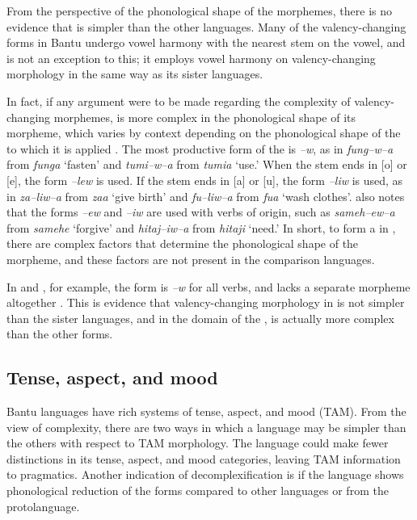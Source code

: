 \documentclass[output=paper,
modfonts
]{langscibook}
\begin{document}
 From the perspective of the phonological shape of the morphemes, there is no evidence that  is simpler than the other languages.   Many of the valency-changing forms in Bantu undergo vowel harmony with the nearest stem on the vowel, and  is not an exception to this; it employs vowel harmony on valency-changing morphology in the same way as its sister languages.

 \largerpage[2]
In fact, if any argument were to be made regarding the complexity of valency-changing morphemes,  is more complex in the phonological shape of its  morpheme, which varies by context depending on the phonological shape of the  to which it is applied \citep{Russell2003}.  The most productive form of the   is \emph{--w}, as in \emph{fung--w--a} from \emph{funga} `fasten' and \emph{tumi--w--a} from \emph{tumia} `use.' When the  stem ends in [o] or [e], the form \emph{--lew} is used. If the  stem ends in [a] or [u], the form \emph{--liw} is used, as in \emph{za--liw--a} from \emph{zaa} `give birth' and \emph{fu--liw--a} from \emph{fua} `wash clothes'.
 \citet{Russell2003} also notes that the  forms \emph{--ew} and \emph{--iw} are used with verbs of  origin, such as \emph{sameh--ew--a} from \emph{samehe} `forgive' and \emph{hitaj--iw--a} from \emph{hitaji} `need.' In short, to form a  in , there are complex factors that determine the phonological shape of the  morpheme, and these factors are not present in the comparison languages. 
 
 In  and , for example, the  form is \emph{--w} for all verbs, and  lacks a separate  morpheme altogether \citep{Guthrie1966}. This is evidence that valency-changing morphology in  is not simpler than the sister languages, and in the domain of the ,  is actually more complex than the other forms. 
 

\subsection{Tense, aspect, and mood}%


  Bantu languages have rich systems of tense, aspect, and mood  (TAM). From the view of complexity, there are two ways in which a language may be simpler than the others with respect to TAM morphology. The language could make fewer distinctions in its tense, aspect, and mood categories, leaving TAM information to pragmatics. Another indication of decomplexification is if the language shows phonological reduction of the forms compared to other languages or from the protolanguage. 
 
\end{document}
